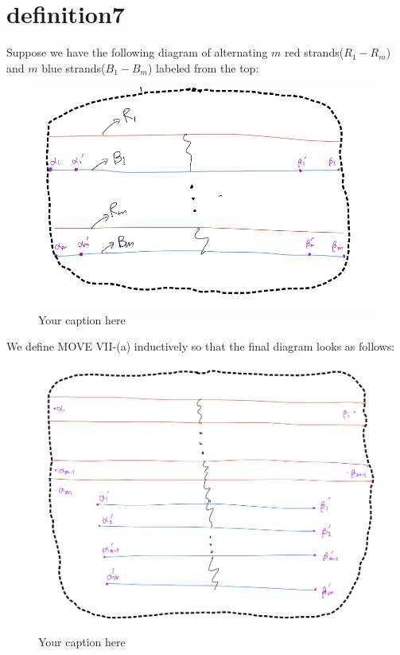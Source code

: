 \section{definition7}
\begin{definition}
\end{definition}

Suppose we have the following diagram of alternating $m$ red strands($R_1 - R_m$) and $m$ blue strands($B_1 - B_m$) labeled from the top:

\begin{figure}[H] %
    \centering
    \includegraphics[width=\linewidth]{diagrams/definition7/1.png} %
    \caption{Your caption here}
    \label{fig:your-label}
\end{figure}

We define MOVE \RN{7}-(a) inductively so that the final diagram looks as follows:

\begin{figure}[H] %
    \centering
    \includegraphics[width=\linewidth]{diagrams/definition7/2.png} %
    \caption{Your caption here}
    \label{fig:your-label}
\end{figure}

